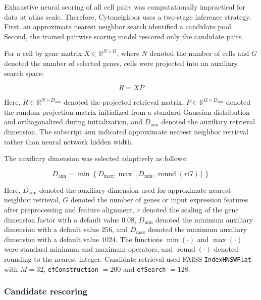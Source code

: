\documentclass[11pt]{article}
\begin{document}
Exhaustive neural scoring of all cell pairs was computationally impractical for data at atlas scale. Therefore, Cytoneighbor uses a two-stage inference strategy. First, an approximate nearest neighbor search identified a candidate pool. Second, the trained pairwise scoring model rescored only the candidate pairs.

For a cell by gene matrix $X\in\mathbb{R}^{N\times G}$, where $N$ denoted the number of cells and $G$ denoted the number of selected genes, cells were projected into an auxiliary search space:

\begin{equation}
R = X P
  \label{eq:R}
\end{equation}

Here, $R\in\mathbb{R}^{N\times D_{\mathrm{ann}}}$ denoted the projected retrieval matrix, $P\in\mathbb{R}^{G\times D_{\mathrm{ann}}}$ denoted the random projection matrix initialized from a standard Gaussian distribution and orthogonalized during initialization, and $D_{\mathrm{ann}}$ denoted the auxiliary retrieval dimension. The subscript $\mathrm{ann}$ indicated approximate nearest neighbor retrieval rather than neural network hidden width.

The auxiliary dimension was selected adaptively as follows:

\begin{equation}
D_{\mathrm{ann}}=
\min
\left\{
D_{\max},
\max
\left[
D_{\min},
\operatorname{round}(rG)
\right]
\right\}
\end{equation}

Here, \(D_{\mathrm{ann}}\) denoted the auxiliary dimension used for approximate nearest neighbor retrieval, \(G\) denoted the number of genes or input expression features after preprocessing and feature alignment, \(r\) denoted the scaling of the gene dimension factor with a default value \(0.08\), \(D_{\min}\) denoted the minimum auxiliary dimension with a default value \(256\), and \(D_{\max}\) denoted the maximum auxiliary dimension with a default value \(1024\). The functions $\min(\cdot)$ and $\max(\cdot)$ were standard minimum and maximum operators, and $\operatorname{round}(\cdot)$ denoted rounding to the nearest integer. Candidate retrieval used FAISS \texttt{IndexHNSWFlat} with \(M=32\), \texttt{efConstruction} \(=200\) and \texttt{efSearch} \(=128\).

\subsubsection*{Candidate rescoring}
\end{document}
